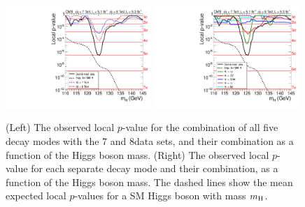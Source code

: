 \documentclass[12pt,twoside,a4paper,cmspaper,final,collab]{cms-tdr}
\begin{document}
\begin{figure} %
\centering
\includegraphics[width=0.49\textwidth]{figures/comb/sqr_pvala_all_energy_smallGGScale_wideX} \hfill
\includegraphics[width=0.49\textwidth]{figures/comb/sqr_pvala_all_bydecay_smallGGScale_wideX}
\caption{
(Left) The observed local $p$-value for the combination of all five decay modes with the 7 and 8\TeV data sets,
and their combination
as a function of the Higgs boson mass.
(Right) The observed local $p$-value for each separate  decay mode
and their combination, as a function of the Higgs boson mass.
The dashed lines show the mean expected local $p$-values for
a SM Higgs boson with  mass $m_{\mathrm{H}}$.
}
\label{fig:pvalue}
\end{figure}
\end{document}
